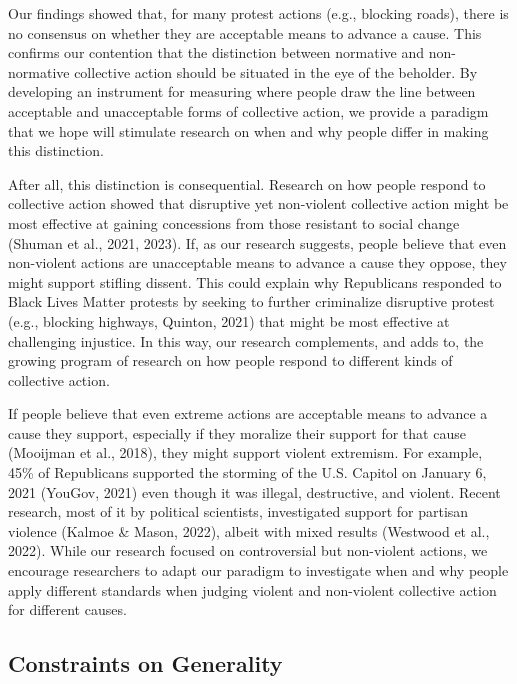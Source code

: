 \documentclass[12pt, letterpaper]{article}
\begin{document}
Our findings showed that, for many protest actions (e.g., blocking
roads), there is no consensus on whether they are acceptable means to
advance a cause. This confirms our contention that the distinction
between normative and non-normative collective action should be situated
in the eye of the beholder. By developing an instrument for measuring
where people draw the line between acceptable and unacceptable forms of
collective action, we provide a paradigm that we hope will stimulate
research on when and why people differ in making this distinction.

After all, this distinction is consequential. Research on how people
respond to collective action showed that disruptive yet non-violent
collective action might be most effective at gaining concessions from
those resistant to social change (Shuman et al., 2021, 2023). If, as our
research suggests, people believe that even non-violent actions are
unacceptable means to advance a cause they oppose, they might support
stifling dissent. This could explain why Republicans responded to Black
Lives Matter protests by seeking to further criminalize disruptive
protest (e.g., blocking highways, Quinton, 2021) that might be most
effective at challenging injustice. In this way, our research
complements, and adds to, the growing program of research on how people
respond to different kinds of collective action.

If people believe that even extreme actions are acceptable means to
advance a cause they support, especially if they moralize their support
for that cause (Mooijman et al., 2018), they might support violent
extremism. For example, 45\% of Republicans supported the storming of
the U.S. Capitol on January 6, 2021 (YouGov, 2021) even though it was
illegal, destructive, and violent. Recent research, most of it by
political scientists, investigated support for partisan violence (Kalmoe
\& Mason, 2022), albeit with mixed results (Westwood et al., 2022).
While our research focused on controversial but non-violent actions, we
encourage researchers to adapt our paradigm to investigate when and why
people apply different standards when judging violent and non-violent
collective action for different causes.

\hypertarget{constraints-on-generality}{%
\subsection{Constraints on Generality}\label{constraints-on-generality}}
\end{document}

